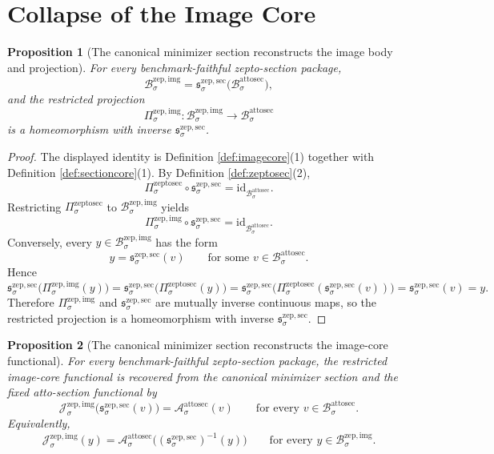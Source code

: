 \documentclass[11pt]{article}
\newcommand{\AttoSectionBody}[1]{\mathcal B_{#1}^{\mathrm{attosec}}}
\newcommand{\AttoSectionFunctional}[1]{\mathscr A_{#1}^{\mathrm{attosec}}}
\newcommand{\ZeptoSectionProj}[1]{\Pi_{#1}^{\mathrm{zeptosec}}}
\newcommand{\ZeptoImgBody}[1]{\mathcal B_{#1}^{\mathrm{zep,img}}}
\newcommand{\ZeptoImgProj}[1]{\Pi_{#1}^{\mathrm{zep,img}}}
\newcommand{\ZeptoImgFunctional}[1]{\mathscr J_{#1}^{\mathrm{zep,img}}}
\newcommand{\ZeptoMinSection}[1]{\mathfrak s_{#1}^{\mathrm{zep,sec}}}
\newtheorem{proposition}{Proposition}
\begin{document}
\section{Collapse of the Image Core}

\begin{proposition}[The canonical minimizer section reconstructs the image body and projection]
\label{prop:reconstructbody}
For every benchmark-faithful zepto-section package,
\[
\ZeptoImgBody{\sigma}
=
\ZeptoMinSection{\sigma}\bigl(\AttoSectionBody{\sigma}\bigr),
\]
and the restricted projection
\[
\ZeptoImgProj{\sigma}:\ZeptoImgBody{\sigma}\to\AttoSectionBody{\sigma}
\]
is a homeomorphism with inverse \(\ZeptoMinSection{\sigma}\).
\end{proposition}

\begin{proof}
The displayed identity is Definition \ref{def:imagecore}(1) together with Definition \ref{def:sectioncore}(1). By Definition \ref{def:zeptosec}(2),
\[
\ZeptoSectionProj{\sigma}\circ\ZeptoMinSection{\sigma}
=
\mathrm{id}_{\AttoSectionBody{\sigma}}.
\]
Restricting \(\ZeptoSectionProj{\sigma}\) to \(\ZeptoImgBody{\sigma}\) yields
\[
\ZeptoImgProj{\sigma}\circ\ZeptoMinSection{\sigma}
=
\mathrm{id}_{\AttoSectionBody{\sigma}}.
\]
Conversely, every \(y\in\ZeptoImgBody{\sigma}\) has the form
\[
y=\ZeptoMinSection{\sigma}(v)
\qquad
\text{for some }
v\in\AttoSectionBody{\sigma}.
\]
Hence
\[
\ZeptoMinSection{\sigma}\bigl(\ZeptoImgProj{\sigma}(y)\bigr)
=
\ZeptoMinSection{\sigma}\bigl(\ZeptoSectionProj{\sigma}(y)\bigr)
=
\ZeptoMinSection{\sigma}\bigl(\ZeptoSectionProj{\sigma}(\ZeptoMinSection{\sigma}(v))\bigr)
=
\ZeptoMinSection{\sigma}(v)
=
y.
\]
Therefore \(\ZeptoImgProj{\sigma}\) and \(\ZeptoMinSection{\sigma}\) are mutually inverse continuous maps, so the restricted projection is a homeomorphism with inverse \(\ZeptoMinSection{\sigma}\).
\end{proof}

\begin{proposition}[The canonical minimizer section reconstructs the image-core functional]
\label{prop:reconstructfunctional}
For every benchmark-faithful zepto-section package, the restricted image-core functional is recovered from the canonical minimizer section and the fixed atto-section functional by
\[
\ZeptoImgFunctional{\sigma}\bigl(\ZeptoMinSection{\sigma}(v)\bigr)
=
\AttoSectionFunctional{\sigma}(v)
\qquad
\text{for every }v\in\AttoSectionBody{\sigma}.
\]
Equivalently,
\[
\ZeptoImgFunctional{\sigma}(y)
=
\AttoSectionFunctional{\sigma}\bigl((\ZeptoMinSection{\sigma})^{-1}(y)\bigr)
\qquad
\text{for every }y\in\ZeptoImgBody{\sigma}.
\]
\end{proposition}
\end{document}
